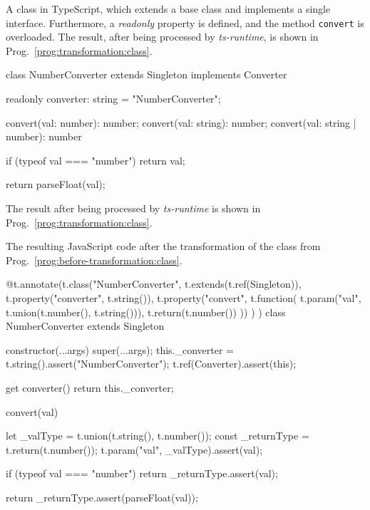 \begin{program}
\caption{A class in TypeScript, which extends a base class and implements a single interface. Furthermore, a \emph{readonly} property is defined, and the method \texttt{convert} is overloaded. The result, after being processed by \emph{ts-runtime}, is shown in Prog.~\ref{prog:transformation:class}.}
\label{prog:before-transformation:class}
\begin{JsCode}
class NumberConverter extends Singleton implements Converter {

  readonly converter: string = "NumberConverter";

  convert(val: number): number;
  convert(val: string): number;
  convert(val: string | number): number {
    if (typeof val === "number") {
      return val;
    }
        
    return parseFloat(val);
  }

}
\end{JsCode}
\end{program}
The result after being processed by \emph{ts-runtime} is shown in Prog.~\ref{prog:transformation:class}.
\begin{program}
\caption{The resulting JavaScript code after the transformation of the class from Prog.~\ref{prog:before-transformation:class}.}
\label{prog:transformation:class}
\begin{JsCode}
@t.annotate(t.class("NumberConverter", t.extends(t.ref(Singleton)),
  t.property("converter", t.string()),
  t.property("convert",
    t.function(
      t.param("val", t.union(t.number(), t.string())),
      t.return(t.number())
    ))
  )
)
class NumberConverter extends Singleton {

  constructor(...args) {
    super(...args);
    this._converter = t.string().assert("NumberConverter");
    t.ref(Converter).assert(this);
  }
  
  get converter() {
    return this._converter;
  }
  
  convert(val) {
    let _valType = t.union(t.string(), t.number());
    const _returnType = t.return(t.number());
    t.param("val", _valType).assert(val);
    
    if (typeof val === "number") {
      return _returnType.assert(val);
    }
    
    return _returnType.assert(parseFloat(val));
  }
  
}
\end{JsCode}
\end{program}

